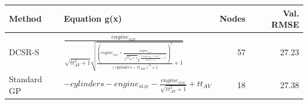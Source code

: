 \begin{tabular}{lp{9cm}rr}
\toprule
Method & Equation g(x) & Nodes & Val. RMSE \\
\midrule
DCSR-S & $\frac{engine_{size}}{\sqrt{tt_{AV}^{2} + 1} \sqrt{\frac{\left(engine_{size} + \frac{engine_{size}}{\sqrt{tt_{AV}^{2} + 1} \sqrt{\frac{\left(engine_{size} - tt_{AV}\right)^{2}}{gears_{f}^{2} + 1} + 1}}\right)^{2}}{\left(cylinders - tt_{AM}\right)^{2} + 1} + 1}}$ & 57 & 27.23 \\
Standard GP & $- cylinders - engine_{size} - \frac{engine_{size}}{\sqrt{tt_{AV}^{2} + 1}} + tt_{AV}$ & 18 & 27.38 \\
\bottomrule
\end{tabular}
